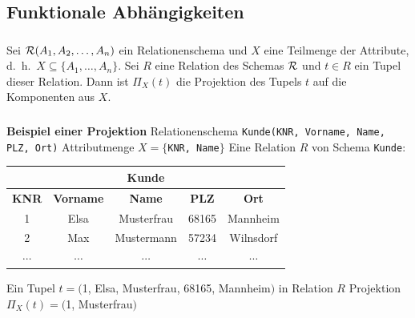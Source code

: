 \subsection{Funktionale Abhängigkeiten}

\begin{frame}\frametitle{\insertsection}
\framesubtitle{\insertsubsection}
\begin{definition}[Projektion]
	Sei $\mathcal{R}(A_1,A_2,\ldots,A_n)$ ein Relationenschema und $X$ eine Teilmenge der Attribute, d.~h.~$X\subseteq\{A_1,\ldots,A_n\}$.
	Sei $R$ eine Relation des Schemas $\mathcal{R}$ und $t\in R$ ein Tupel dieser Relation. Dann ist $\Pi_X(t)$ die Projektion des Tupels 
	$t$ auf die Komponenten aus $X$.
\end{definition}
\end{frame}

\begin{frame}\frametitle{\insertsection}
\framesubtitle{\insertsubsection}
\textbf{Beispiel einer Projektion}
\abs
Relationenschema \texttt{Kunde(KNR, Vorname, Name, PLZ, Ort)}
\nl 
Attributmenge $X=\{$\texttt{KNR, Name}$\}$
\nl
Eine Relation $R$ von Schema \texttt{Kunde}:
\begin{center}
	\begin{tabular}{|c|c|c|c|c|}\hline
		\multicolumn{5}{|c|}{\small \textbf{Kunde}}\\\hline\hline
		\small \textbf{KNR} & \small \textbf{Vorname} & \small \textbf{Name} & \small \textbf{PLZ} & \small \textbf{Ort} \\\hline
		\small 1 &\small Elsa &\small Musterfrau &\small 68165 &\small Mannheim \\\hline
		\small 2 & \small Max &\small  Mustermann & \small 57234 &\small Wilnsdorf \\\hline
		$\cdots$ & $\cdots$ & $\cdots$ & $\cdots$ & $\cdots$ \\\hline
	\end{tabular}
\end{center}
\onslide\pause
\nl
Ein Tupel $t =($1, Elsa, Musterfrau, 68165, Mannheim$)$ in Relation $R$
\pause
\abs
Projektion $\Pi_X(t)=($1, Musterfrau$)$
\end{frame}

